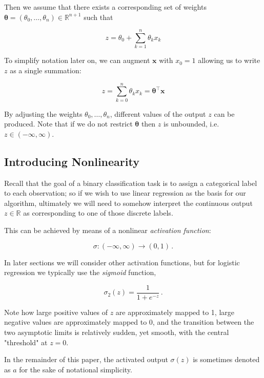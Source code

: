 \documentclass{article}[11pt]
\begin{document}
        Then we assume that there exists a corresponding set of weights $\boldsymbol{\theta} = (\theta_0, \ldots, \theta_n) \in \mathbb{R}^{n+1}$ such that
        
        $$
        z = \theta_0 + \sum_{k=1}^n \theta_k x_k
        $$
        
        To simplify notation later on, we can augment $\mathbf{x}$ with $x_0 = 1$ allowing us to write $z$ as a single summation:
        
        $$
        z = \sum_{k=0}^n \theta_k x_k = \boldsymbol{\theta}^\top \mathbf{x}
        $$
        
        By adjusting the weights $\theta_0, \ldots, \theta_n$, different values of the output $z$ can be produced. Note that if we do not restrict $\boldsymbol{\theta}$ then $z$ is unbounded, i.e. $z \in (-\infty, \infty)$.
        
        
        
    \subsection{Introducing Nonlinearity}
        
        Recall that the goal of a binary classification task is to assign a categorical label to each observation; so if we wish to use linear regression as the basis for our algorithm, ultimately we will need to somehow interpret the continuous output $z \in \mathbb{R}$ as corresponding to one of those discrete labels.
        
        This can be achieved by means of a nonlinear \textit{activation function}:
        
        $$
        \sigma \colon (-\infty, \infty) \to (0, 1) \,.
        $$
        
        In later sections we will consider other activation functions, but for logistic regression we typically use the \textit{sigmoid} function,
            
        $$
        \sigma_2(z) = \frac{1}{1 + e^{-z}} \,.
        $$
        
        
        
        
        Note how large positive values of $z$ are approximately mapped to 1, large negative values are approximately mapped to 0, and the transition between the two asymptotic limits is relatively sudden, yet smooth, with the central "threshold" at $z = 0$.
        
        In the remainder of this paper, the activated output $\sigma(z)$ is sometimes denoted as $a$ for the sake of notational simplicity.
        
\end{document}
